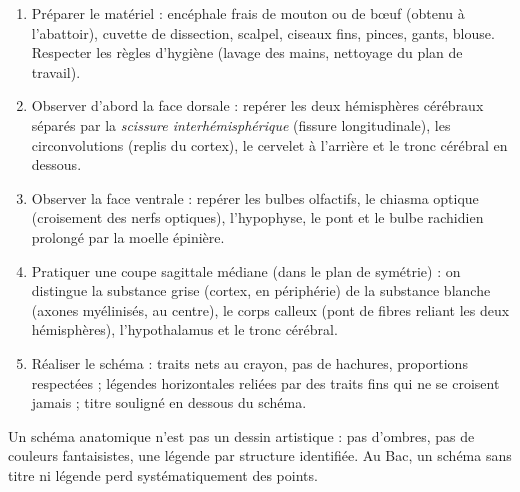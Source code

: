 \documentclass[11pt]{article}
\newcommand{\cle}[1]{{\popxbold\color{popdark}#1}}
\begin{document}
\begin{methode}
\begin{enumerate}
\item \cle{Préparer} le matériel : encéphale frais de mouton ou de bœuf (obtenu à l'abattoir), cuvette de dissection, scalpel, ciseaux fins, pinces, gants, blouse. Respecter les règles d'hygiène (lavage des mains, nettoyage du plan de travail).
\item \cle{Observer d'abord la face dorsale} : repérer les deux hémisphères cérébraux séparés par la \emph{scissure interhémisphérique} (fissure longitudinale), les circonvolutions (replis du cortex), le cervelet à l'arrière et le tronc cérébral en dessous.
\item \cle{Observer la face ventrale} : repérer les bulbes olfactifs, le chiasma optique (croisement des nerfs optiques), l'hypophyse, le pont et le bulbe rachidien prolongé par la moelle épinière.
\item \cle{Pratiquer une coupe sagittale médiane} (dans le plan de symétrie) : on distingue la substance grise (cortex, en périphérie) de la substance blanche (axones myélinisés, au centre), le corps calleux (pont de fibres reliant les deux hémisphères), l'hypothalamus et le tronc cérébral.
\item \cle{Réaliser le schéma} : traits nets au crayon, pas de hachures, proportions respectées ; légendes horizontales reliées par des traits fins qui ne se croisent jamais ; titre souligné en dessous du schéma.
\end{enumerate}
\begin{attention}
Un schéma anatomique n'est pas un dessin artistique : pas d'ombres, pas de couleurs fantaisistes, une légende par structure identifiée. Au Bac, un schéma sans titre ni légende perd systématiquement des points.
\end{attention}
\end{methode}
\end{document}
